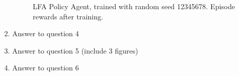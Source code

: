 \documentclass[11pt,a4paper]{article}
\begin{document}
\begin{enumerate}
\begin{figure}
\begin{center}
		\caption{LFA Policy Agent, trained with random seed 12345678. Episode rewards after training.}
		\label{fig:4}
	\end{center}
	\end{figure}
\item Answer to question 4
\item Answer to question 5 (include 3 figures)
\item Answer to question 6
\end{enumerate}
\end{document}
